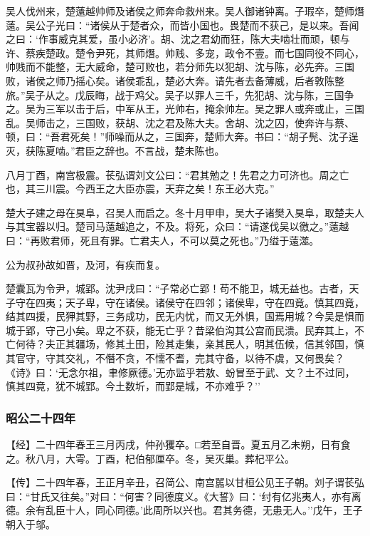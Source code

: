 \documentclass[]{article}
\begin{document}
吴人伐州来，楚薳越帅师及诸侯之师奔命救州来。吴人御诸钟离。子瑕卒，楚师熸薳。吴公子光曰：``诸侯从于楚者众，而皆小国也。畏楚而不获己，是以来。吾闻之曰：`作事威克其爱，虽小必济'。胡、沈之君幼而狂，陈大夫啮壮而顽，顿与许、蔡疾楚政。楚令尹死，其师熸。帅贱、多宠，政令不壹。而七国同役不同心，帅贱而不能整，无大威命，楚可败也，若分师先以犯胡、沈与陈，必先奔。三国败，诸侯之师乃摇心矣。诸侯乖乱，楚必大奔。请先者去备薄威，后者敦陈整旅。''吴子从之。戊辰晦，战于鸡父。吴子以罪人三千，先犯胡、沈与陈，三国争之。吴为三军以击于后，中军从王，光帅右，掩余帅左。吴之罪人或奔或止，三国乱。吴师击之，三国败，获胡、沈之君及陈大夫。舍胡、沈之囚，使奔许与蔡、顿，曰：``吾君死矣！''师噪而从之，三国奔，楚师大奔。书曰：``胡子髡、沈子逞灭，获陈夏啮。''君臣之辞也。不言战，楚未陈也。

八月丁酉，南宫极震。苌弘谓刘文公曰：``君其勉之！先君之力可济也。周之亡也，其三川震。今西王之大臣亦震，天弃之矣！东王必大克。''

楚大子建之母在狊阜，召吴人而启之。冬十月甲申，吴大子诸樊入狊阜，取楚夫人与其宝器以归。楚司马薳越追之，不及。将死，众曰：``请遂伐吴以徼之。''薳越曰：``再败君师，死且有罪。亡君夫人，不可以莫之死也。''乃缢于薳澨。

公为叔孙故如晋，及河，有疾而复。

楚囊瓦为令尹，城郢。沈尹戌曰：``子常必亡郢！苟不能卫，城无益也。古者，天子守在四夷；天子卑，守在诸侯。诸侯守在四邻；诸侯卑，守在四竟。慎其四竟，结其四援，民狎其野，三务成功，民无内忧，而又无外惧，国焉用城？今吴是惧而城于郢，守己小矣。卑之不获，能无亡乎？昔梁伯沟其公宫而民溃。民弃其上，不亡何待？夫正其疆场，修其土田，险其走集，亲其民人，明其伍候，信其邻国，慎其官守，守其交礼，不僭不贪，不懦不耆，完其守备，以待不虞，又何畏矣？《诗》曰：`无念尔祖，聿修厥德。'无亦监乎若敖、蚡冒至于武、文？土不过同，慎其四竟，犹不城郢。今土数圻，而郢是城，不亦难乎？''

\hypertarget{header-n2753}{%
\subsubsection{昭公二十四年}\label{header-n2753}}

【经】二十四年春王三月丙戌，仲孙玃卒。□若至自晋。夏五月乙未朔，日有食之。秋八月，大雩。丁酉，杞伯郁厘卒。冬，吴灭巢。葬杞平公。

【传】二十四年春，王正月辛丑，召简公、南宫嚚以甘桓公见王子朝。刘子谓苌弘曰：``甘氏又往矣。''对曰：``何害？同德度义。《大誓》曰：`纣有亿兆夷人，亦有离德。余有乱臣十人，同心同德。'此周所以兴也。君其务德，无患无人。''戊午，王子朝入于邬。
\end{document}
